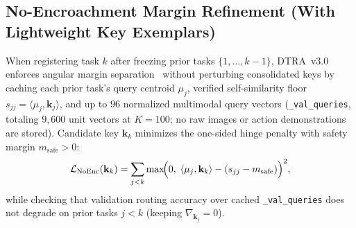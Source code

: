 \documentclass[10pt]{article}
\begin{document}
\subsection{No-Encroachment Margin Refinement (With Lightweight Key Exemplars)}
When registering task $k$ after freezing prior tasks $\{1,\dots,k-1\}$, DTRA~v3.0 enforces angular margin separation~\cite{deng2019arcface} without perturbing consolidated keys by caching each prior task's query centroid $\mu_j$, verified self-similarity floor $s_{jj} = \langle \mu_j, \mathbf{k}_j \rangle$, and up to $96$ normalized multimodal query vectors (\texttt{\_val\_queries}, totaling $9{,}600$ unit vectors at $K=100$; no raw images or action demonstrations are stored). Candidate key $\mathbf{k}_k$ minimizes the one-sided hinge penalty with safety margin $m_{\text{safe}} > 0$:
\begin{equation}
  \mathcal{L}_{\text{NoEnc}}(\mathbf{k}_k) = \sum_{j < k} \max\!\Bigl(0,\; \langle \mu_j, \mathbf{k}_k \rangle - (s_{jj} - m_{\text{safe}})\Bigr)^2,
\end{equation}
while checking that validation routing accuracy over cached \texttt{\_val\_queries} does not degrade on prior tasks $j < k$ (keeping $\nabla_{\mathbf{k}_j} = 0$).
\end{document}
